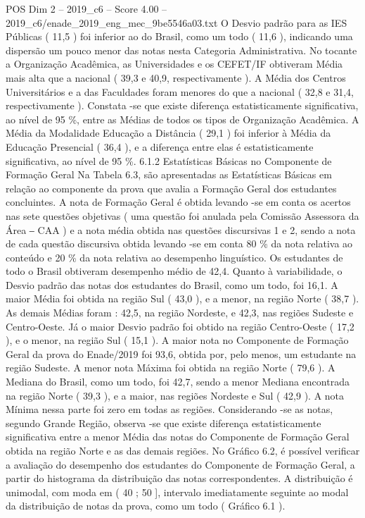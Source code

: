 \begin{textsample}{POS Dim 2 – 2019\_c6 – Score 4.00 – 2019\_c6/enade\_2019\_eng\_mec\_9be5546a03.txt}
O Desvio padrão para as IES Públicas ( 11,5 ) foi inferior ao do Brasil, como um todo ( 11,6 ), indicando uma dispersão um pouco menor das notas nesta Categoria Administrativa.
No tocante a Organização Acadêmica, as Universidades e os CEFET/IF obtiveram Média mais alta que a nacional ( 39,3 e 40,9, respectivamente ).
A Média dos Centros Universitários e a das Faculdades foram menores do que a nacional ( 32,8 e 31,4, respectivamente ).
Constata -se que existe diferença estatisticamente significativa, ao nível de 95 \%, entre as Médias de todos os tipos de Organização Acadêmica.
A Média da Modalidade Educação a Distância ( 29,1 ) foi inferior à Média da Educação Presencial ( 36,4 ), e a diferença entre elas é estatisticamente significativa, ao nível de 95 \%. 6.1.2 Estatísticas Básicas no Componente de Formação Geral Na Tabela 6.3, são apresentadas as Estatísticas Básicas em relação ao componente da prova que avalia a Formação Geral dos estudantes concluintes.
A nota de Formação Geral é obtida levando -se em conta os acertos nas sete questões objetivas ( uma questão foi anulada pela Comissão Assessora da Área ‒ CAA ) e a nota média obtida nas questões discursivas 1 e 2, sendo a nota de cada questão discursiva obtida levando -se em conta 80 \% da nota relativa ao conteúdo e 20 \% da nota relativa ao desempenho linguístico.
Os estudantes de todo o Brasil obtiveram desempenho médio de 42,4.
Quanto à variabilidade, o Desvio padrão das notas dos estudantes do Brasil, como um todo, foi 16,1.
A maior Média foi obtida na região Sul ( 43,0 ), e a menor, na região Norte ( 38,7 ).
As demais Médias foram : 42,5, na região Nordeste, e 42,3, nas regiões Sudeste e Centro-Oeste.
Já o maior Desvio padrão foi obtido na região Centro-Oeste ( 17,2 ), e o menor, na região Sul ( 15,1 ).
A maior nota no Componente de Formação Geral da prova do Enade/2019 foi 93,6, obtida por, pelo menos, um estudante na região Sudeste.
A menor nota Máxima foi obtida na região Norte ( 79,6 ).
A Mediana do Brasil, como um todo, foi 42,7, sendo a menor Mediana encontrada na região Norte ( 39,3 ), e a maior, nas regiões Nordeste e Sul ( 42,9 ).
A nota Mínima nessa parte foi zero em todas as regiões.
Considerando -se as notas, segundo Grande Região, observa -se que existe diferença estatisticamente significativa entre a menor Média das notas do Componente de Formação Geral obtida na região Norte e as das demais regiões.
No Gráfico 6.2, é possível verificar a avaliação do desempenho dos estudantes do Componente de Formação Geral, a partir do histograma da distribuição das notas correspondentes.
A distribuição é unimodal, com moda em ( 40 ; 50 ], intervalo imediatamente seguinte ao modal da distribuição de notas da prova, como um todo ( Gráfico 6.1 ).

\end{textsample}
